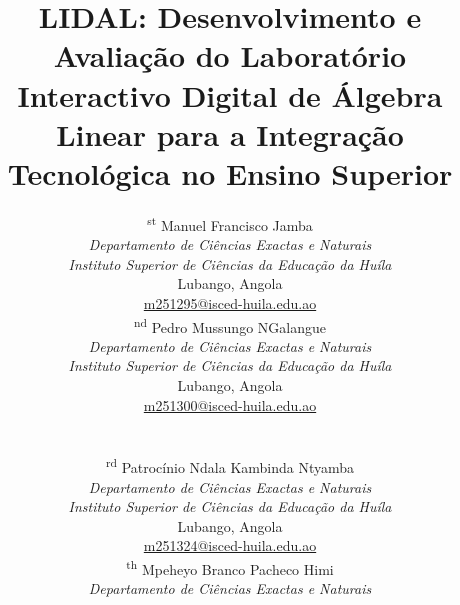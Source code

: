 \documentclass[conference]{IEEEtran}
\begin{document}
\title{LIDAL: Desenvolvimento e Avaliação do Laboratório Interactivo Digital de Álgebra Linear para a Integração Tecnológica no Ensino Superior}

\author{
\begin{minipage}[t]{0.48\textwidth}\textsuperscript{st} Manuel Francisco Jamba\\
\textit{Departamento de Ciências Exactas e Naturais}\\
\textit{Instituto Superior de Ciências da Educação da Huíla}\\
Lubango, Angola\\
\href{mailto:m251295@isced-huila.edu.ao}{m251295@isced-huila.edu.ao}
\end{minipage}%
\hfill
\begin{minipage}[t]{0.48\textwidth}\textsuperscript{nd} Pedro Mussungo NGalangue\\
\textit{Departamento de Ciências Exactas e Naturais}\\
\textit{Instituto Superior de Ciências da Educação da Huíla}\\
Lubango, Angola\\
\href{mailto:m251300@isced-huila.edu.ao}{m251300@isced-huila.edu.ao}
\end{minipage}\\[1.4em]
\begin{minipage}[t]{0.48\textwidth}\textsuperscript{rd} Patrocínio Ndala Kambinda Ntyamba\\
\textit{Departamento de Ciências Exactas e Naturais}\\
\textit{Instituto Superior de Ciências da Educação da Huíla}\\
Lubango, Angola\\
\href{mailto:m251324@isced-huila.edu.ao}{m251324@isced-huila.edu.ao}
\end{minipage}%
\hfill
\begin{minipage}[t]{0.48\textwidth}\textsuperscript{th} Mpeheyo Branco Pacheco Himi\\
\textit{Departamento de Ciências Exactas e Naturais}\\

\end{minipage}}
\end{document}
